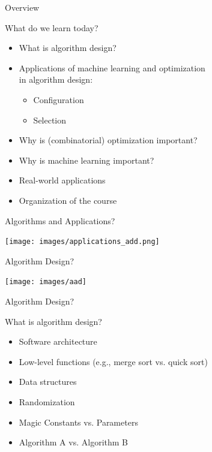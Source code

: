 \begin{frame}[c]{Overview}

What do we learn today?

\begin{itemize}
  \item What is algorithm design?
  \item Applications of machine learning and optimization\\ in algorithm design:
  \begin{itemize}
  	\item Configuration
	\item Selection 
  \end{itemize} 
  \item Why is (combinatorial) optimization important?
  \item Why is machine learning important?
  \item Real-world applications
  \item Organization of the course
\end{itemize}

\end{frame}
\begin{frame}[c]{Algorithms and Applications?}

\texttt{[image: images/applications\_add.png]}

\end{frame}
\begin{frame}[c]{Algorithm Design?}

\centering
\texttt{[image: images/aad]}

\end{frame}
\begin{frame}[c]{Algorithm Design?}

{\large
What is algorithm design?}

\bigskip
\pause

\begin{itemize}
  \item Software architecture
  \item Low-level functions (e.g., merge sort vs. quick sort)
  \item Data structures
  \item Randomization
  \medskip
  \pause
  \item \alert{Magic Constants vs. Parameters}
  \item \alert{Algorithm A vs. Algorithm B}
\end{itemize}

\end{frame}
